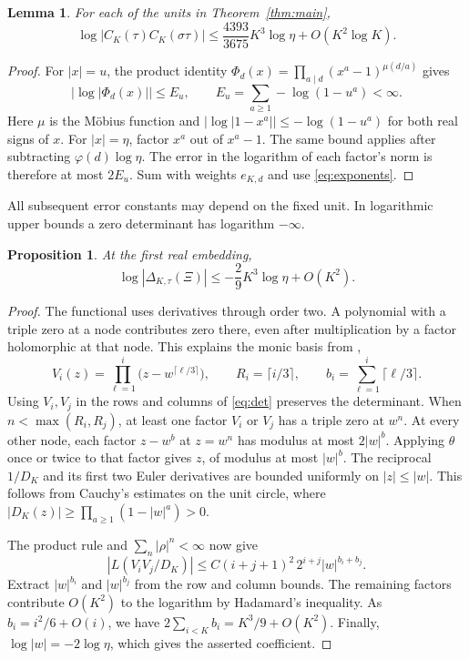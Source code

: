 \documentclass[11pt,letterpaper]{article}
\newtheorem{proposition}[theorem]{Proposition}
\newtheorem{lemma}[theorem]{Lemma}
\numberwithin{equation}{section}
\begin{document}
\begin{lemma}\label{lem:normcost}
For each of the units in Theorem~\ref{thm:main},
\[
 \log|C_K(\tau)C_K(\sigma\tau)|
     \le \frac{4393}{3675}K^3\log\eta+O(K^2\log K).
\]
\end{lemma}
\begin{proof}
For \(|x|=u\), the product identity
\(\Phi_d(x)=\prod_{a\mid d}(x^a-1)^{\mu(d/a)}\) gives
\[
 \big|\log|\Phi_d(x)|\big|\le E_u,\qquad
            E_u=\sum_{a\ge1}-\log(1-u^a)<\infty .
\]
Here \(\mu\) is the M\"obius function and
\(\big|\log|1-x^a|\big|\le-\log(1-u^a)\) for both real signs of \(x\).
For \(|x|=\eta\), factor \(x^a\) out of \(x^a-1\). The same bound
applies after subtracting \(\varphi(d)\log\eta\). The error in the
logarithm of each factor's norm is therefore at most \(2E_u\).
Sum with weights \(e_{K,d}\) and use \eqref{eq:exponents}.
\end{proof}

All subsequent error constants may depend on the fixed unit. In
logarithmic upper bounds a zero determinant has logarithm \(-\infty\).
\begin{proposition}\label{prop:first}
At the first real embedding,
\[
             \log|\Delta_{K,\tau}(\Xi)|
                    \le -\frac29 K^3\log\eta+O(K^2).
\]
\end{proposition}
\begin{proof}
The functional uses derivatives through order two. A polynomial with a
triple zero at a node contributes zero there, even after multiplication
by a factor holomorphic at that node. This explains the monic basis
from \cite[Proposition~3.1]{KLucas},
\[
 V_i(z)=\prod_{\ell=1}^i\big(z-w^{\lceil\ell/3\rceil}\big),\qquad
 R_i=\lceil i/3\rceil,\qquad b_i=\sum_{\ell=1}^i\lceil\ell/3\rceil .
\]
Using \(V_i,V_j\) in the rows and columns of \eqref{eq:det} preserves
the determinant. When \(n<\max(R_i,R_j)\), at least one factor \(V_i\)
or \(V_j\) has a triple zero at \(w^n\). At every other node, each
factor \(z-w^b\) at \(z=w^n\) has modulus at most \(2|w|^b\).
Applying \(\theta\) once or twice to that factor gives \(z\), of
modulus at most \(|w|^b\). The reciprocal \(1/D_K\) and its first
two Euler derivatives are bounded uniformly on \(|z|\le|w|\). This
follows from Cauchy's estimates on the unit circle, where
\(|D_K(z)|\ge\prod_{a\ge1}(1-|w|^a)>0\).

The product rule and \(\sum_n|\rho|^n<\infty\) now give
\[
       |L(V_iV_j/D_K)|
        \le C(i+j+1)^2\,2^{i+j}|w|^{b_i+b_j}.
\]
Extract \(|w|^{b_i}\) and \(|w|^{b_j}\) from the row and column
bounds. The remaining factors contribute \(O(K^2)\) to the logarithm
by Hadamard's inequality. As \(b_i=i^2/6+O(i)\), we have
\(2\sum_{i<K} b_i=K^3/9+O(K^2)\). Finally,
\(\log|w|=-2\log\eta\), which gives the asserted coefficient.
\end{proof}
\end{document}
